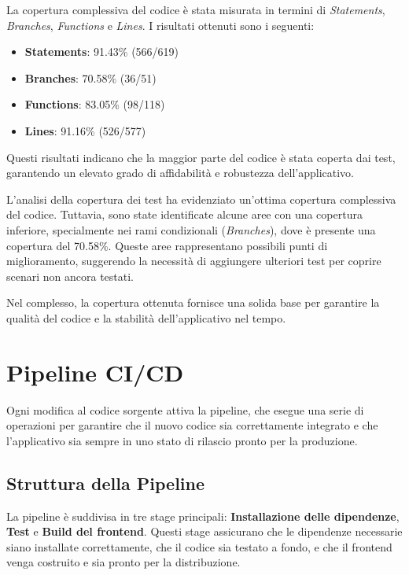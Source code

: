 \documentclass[twoside]{supsistudent}
\begin{document}
La copertura complessiva del codice è stata misurata in termini di \textit{Statements}, \textit{Branches}, \textit{Functions} e \textit{Lines}. I risultati ottenuti sono i seguenti:

\begin{itemize}
  \item \textbf{Statements}: 91.43\% (566/619)
  \item \textbf{Branches}: 70.58\% (36/51)
  \item \textbf{Functions}: 83.05\% (98/118)
  \item \textbf{Lines}: 91.16\% (526/577)
\end{itemize}

Questi risultati indicano che la maggior parte del codice è stata coperta dai test, garantendo un elevato grado di affidabilità e robustezza dell'applicativo.





L'analisi della copertura dei test ha evidenziato un'ottima copertura complessiva del codice. Tuttavia, sono state identificate alcune aree con una copertura inferiore, specialmente nei rami condizionali (\textit{Branches}), dove è presente una copertura del 70.58\%. Queste aree rappresentano possibili punti di miglioramento, suggerendo la necessità di aggiungere ulteriori test per coprire scenari non ancora testati.

Nel complesso, la copertura ottenuta fornisce una solida base per garantire la qualità del codice e la stabilità dell'applicativo nel tempo.

\section{Pipeline CI/CD}

Ogni modifica al codice sorgente attiva la pipeline, che esegue una serie di operazioni per garantire che il nuovo codice sia correttamente integrato e che l'applicativo sia sempre in uno stato di rilascio pronto per la produzione.

\subsection{Struttura della Pipeline}

La pipeline è suddivisa in tre stage principali: \textbf{Installazione delle dipendenze}, \textbf{Test} e \textbf{Build del frontend}. Questi stage assicurano che le dipendenze necessarie siano installate correttamente, che il codice sia testato a fondo, e che il frontend venga costruito e sia pronto per la distribuzione.
\end{document}
